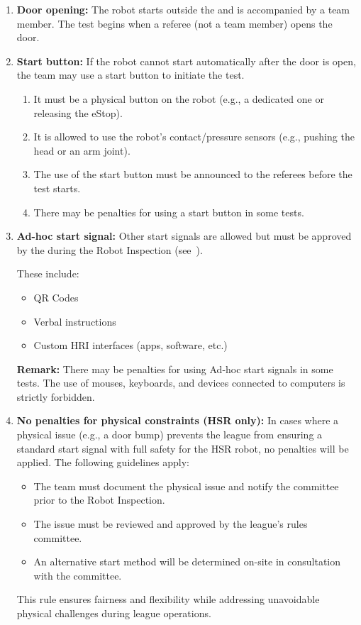 \begin{enumerate}
    \item \textbf{Door opening:} The robot starts outside the \Arena{} and is accompanied by a team member. The test begins when a referee (not a team member) opens the door.

    \item \textbf{Start button:} If the robot cannot start automatically after the door is open, the team may use a start button to initiate the test.
    \begin{enumerate}[nosep]
        \item It must be a physical button on the robot (e.g., a dedicated one or releasing the eStop).
        \item It is allowed to use the robot's contact/pressure sensors (e.g., pushing the head or an arm joint).
        \item The use of the start button must be announced to the referees before the test starts.
        \item There may be penalties for using a start button in some tests.
    \end{enumerate}

    \item \textbf{Ad-hoc start signal:} Other start signals are allowed but must be approved by the \TC{} during the Robot Inspection (see~).

    These include:
    \begin{itemize}[nosep]
        \item QR Codes
        \item Verbal instructions
        \item Custom HRI interfaces (apps, software, etc.)
    \end{itemize}
    \textbf{Remark:} There may be penalties for using Ad-hoc start signals in some tests. The use of mouses, keyboards, and devices connected to \ECRA{} computers is strictly forbidden.

    \item \textbf{No penalties for physical constraints (HSR only):} 
    In cases where a physical issue (e.g., a door bump) prevents the league from ensuring a standard start signal with full safety for the HSR robot, no penalties will be applied. The following guidelines apply:
    \begin{itemize}[nosep]
        \item The team must document the physical issue and notify the committee prior to the Robot Inspection.
        \item The issue must be reviewed and approved by the league's rules committee.
        \item An alternative start method will be determined on-site in consultation with the committee.
    \end{itemize}
    This rule ensures fairness and flexibility while addressing unavoidable physical challenges during league operations.
\end{enumerate}

